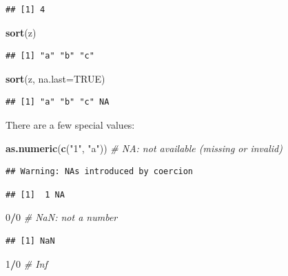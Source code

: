 \documentclass[12pt,]{book}
\newenvironment{Shaded}{\begin{snugshade}}{\end{snugshade}}
\newcommand{\CommentTok}[1]{\textcolor[rgb]{0.56,0.35,0.01}{\textit{#1}}}
\newcommand{\DataTypeTok}[1]{\textcolor[rgb]{0.13,0.29,0.53}{#1}}
\newcommand{\DecValTok}[1]{\textcolor[rgb]{0.00,0.00,0.81}{#1}}
\newcommand{\KeywordTok}[1]{\textcolor[rgb]{0.13,0.29,0.53}{\textbf{#1}}}
\newcommand{\NormalTok}[1]{#1}
\newcommand{\OperatorTok}[1]{\textcolor[rgb]{0.81,0.36,0.00}{\textbf{#1}}}
\newcommand{\OtherTok}[1]{\textcolor[rgb]{0.56,0.35,0.01}{#1}}
\newcommand{\StringTok}[1]{\textcolor[rgb]{0.31,0.60,0.02}{#1}}
\begin{document}
\begin{verbatim}
## [1] 4
\end{verbatim}

\begin{Shaded}
\begin{Highlighting}[]
\KeywordTok{sort}\NormalTok{(z)}
\end{Highlighting}
\end{Shaded}

\begin{verbatim}
## [1] "a" "b" "c"
\end{verbatim}

\begin{Shaded}
\begin{Highlighting}[]
\KeywordTok{sort}\NormalTok{(z, }\DataTypeTok{na.last=}\OtherTok{TRUE}\NormalTok{)}
\end{Highlighting}
\end{Shaded}

\begin{verbatim}
## [1] "a" "b" "c" NA
\end{verbatim}

There are a few special values:

\begin{Shaded}
\begin{Highlighting}[]
\KeywordTok{as.numeric}\NormalTok{(}\KeywordTok{c}\NormalTok{(}\StringTok{"1"}\NormalTok{, }\StringTok{"a"}\NormalTok{)) }\CommentTok{# NA: not available (missing or invalid)}
\end{Highlighting}
\end{Shaded}

\begin{verbatim}
## Warning: NAs introduced by coercion
\end{verbatim}

\begin{verbatim}
## [1]  1 NA
\end{verbatim}

\begin{Shaded}
\begin{Highlighting}[]
\DecValTok{0}\OperatorTok{/}\DecValTok{0} \CommentTok{# NaN: not a number}
\end{Highlighting}
\end{Shaded}

\begin{verbatim}
## [1] NaN
\end{verbatim}

\begin{Shaded}
\begin{Highlighting}[]
\DecValTok{1}\OperatorTok{/}\DecValTok{0} \CommentTok{# Inf}
\end{Highlighting}
\end{Shaded}
\end{document}

